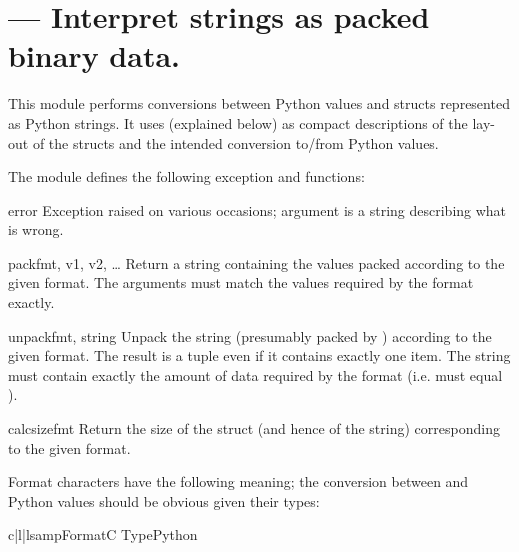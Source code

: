 \section{ ---
         Interpret strings as packed binary data.}



This module performs conversions between Python values and \C{}
structs represented as Python strings.  It uses 
(explained below) as compact descriptions of the lay-out of the \C{}
structs and the intended conversion to/from Python values.

The module defines the following exception and functions:


\begin{excdesc}{error}
  Exception raised on various occasions; argument is a string
  describing what is wrong.
\end{excdesc}

\begin{funcdesc}{pack}{fmt, v1, v2, \textrm{\ldots}}
  Return a string containing the values
   packed according to the given
  format.  The arguments must match the values required by the format
  exactly.
\end{funcdesc}

\begin{funcdesc}{unpack}{fmt, string}
  Unpack the string (presumably packed by ) according to the given format.  The result is a
  tuple even if it contains exactly one item.  The string must contain
  exactly the amount of data required by the format (i.e.
   must equal ).
\end{funcdesc}

\begin{funcdesc}{calcsize}{fmt}
  Return the size of the struct (and hence of the string)
  corresponding to the given format.
\end{funcdesc}

Format characters have the following meaning; the conversion between
\C{} and Python values should be obvious given their types:

\begin{tableiii}{c|l|l}{samp}{Format}{C Type}{Python}
\end{tableiii}


